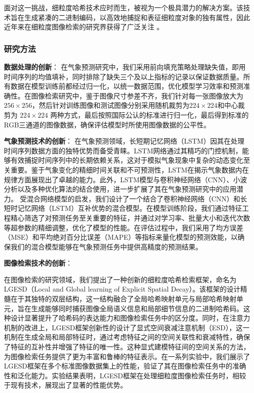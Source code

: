 面对这一挑战，细粒度哈希技术应时而生，被视为一个极具潜力的解决方案。该技术旨在生成紧凑的二进制编码，以高效地捕捉和表征细粒度对象的独有属性，因此近年来在细粒度图像检索的研究界获得了广泛关注 \cite{solving9157668}\cite{Zeng_2024}\cite{DSH9037360}。

\subsubsection{研究方法}

\textbf{数据处理的创新}：
在气象预测研究中，我们采用前向填充策略处理缺失值，即用时间序列的均值填补，同时排除了缺失三个及以上指标的记录以保证数据质量。所有数据在模型训练前都经过归一化，以统一数据范围，优化模型学习效率和预测准确性。在图像检索研究中，鉴于图像尺寸参差不齐，我们针对每一张图像放大为 $256 \times 256$，然后针对训练图像和测试图像分别采用随机裁剪为$224 \times 224$和中心裁剪为 $224 \times 224$ 两种方式，最后按照国际公认的标准进行归一化，最后得到标准的RGB三通道的图像数据，确保评估模型时所使用图像数据的公平性。

\textbf{气象预测技术的创新}：
在气象预测领域，长短期记忆网络（LSTM）因其在处理时间序列数据方面的独特优势而备受青睐。LSTM网络通过其精巧的门控机制，能够有效捕捉时间序列中的长期依赖关系，这对于模拟气象现象中复杂的动态变化至关重要。鉴于气象变化的精细时间关联和不可预测性，LSTM在揭示气象数据内在规律方面展现出了卓越的能力。此外，LSTM模型与卷积神经网络（CNN）、小波分析以及多种优化算法的结合使用\cite{HJKZ2024011600J}\cite{JYGC20240415002}\cite{HBYD202401011}\cite{DLJS202401002}，进一步扩展了其在气象预测研究中的应用潜力。
受混合网络模型的启发，我们设计了一个结合了卷积神经网络（CNN）和长短时记忆网络（LSTM）互补优势的混合模型。在模型训练阶段，我们通过特征工程精心筛选了对预测任务至关重要的特征，并通过对学习率、批量大小和迭代次数等超参数的精细调整，优化了模型的性能。在评估过程中，我们采用了均方误差（MSE）和平均绝对百分比误差（MAPE）等指标来量化模型的预测效能，以确保我们的混合模型能够在气象预测任务中提供高精度的预测结果。

\textbf{图像检索技术的创新}：


在图像检索的研究领域，我们提出了一种创新的细粒度哈希检索框架，命名为LGESD（Local and Global learning of Explicit Spatial Decay）。该框架的设计精髓在于其独特的双层结构，这一结构融合了全局哈希映射单元与局部哈希映射单元，旨在生成能够同时捕获图像全局语义信息和局部细节信息的二进制哈希码。这种设计显著提升了哈希码的表达能力和图像检索任务中的区分度。同时，在注意力机制的改进上，LGESD框架创新性的设计了显式空间衰减注意机制（ESD），这一机制在生成全局和局部特征时，通过考虑特征之间的空间关联性和衰减特性，确保了特征的互补性并增强了特征的唯一性。这种显式建模特征间的空间关系的方法，为图像检索任务提供了更为丰富和鲁棒的特征表示。在一系列实验中，我们展示了LGESD框架在多个标准图像数据集上的性能，验证了其在图像检索任务中的准确性和泛化能力。实验结果表明，LGESD框架在处理细粒度图像检索任务时，相较于现有技术，展现出了显著的性能优势。

